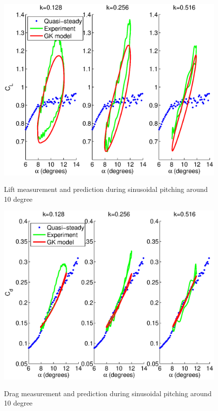 \begin{figure}[h]
  \begin{center}
    \scalebox{0.8}  
    {\includegraphics{./Figures/Pitching_allcases_GK_CL_10_amp_2.eps}}
  \end{center}
  \caption{Lift measurement and prediction during sinusoidal pitching around 10 degree} 
  \label{fig:Pitching_allcases_GK_Cl_10}
\end{figure}

\begin{figure}[h]
  \begin{center}
    \scalebox{0.8}  
    {\includegraphics{./Figures/Pitching_allcases_GK_CD_10_amp_2.eps}}
  \end{center}
  \caption{Drag measurement and prediction during sinusoidal pitching around 10 degree} 
  \label{fig:Pitching_allcases_GK_Cd_10}
\end{figure}

